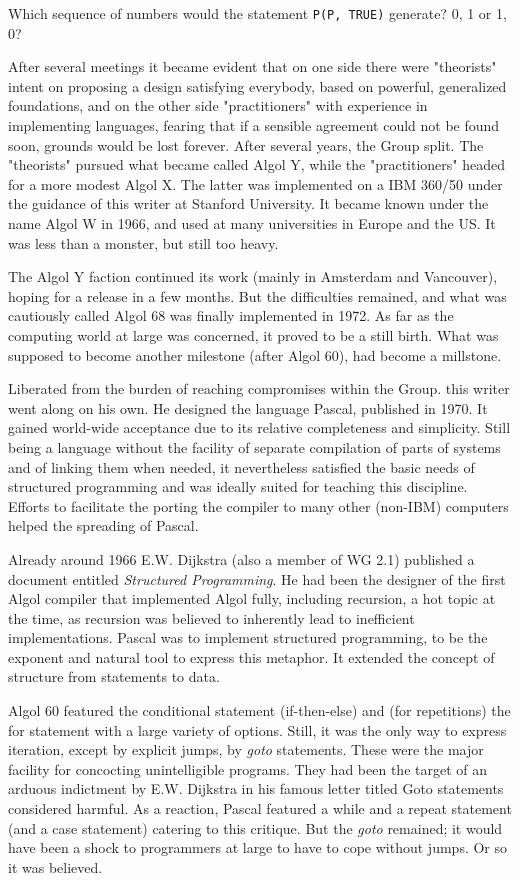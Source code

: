 Which sequence of numbers would the statement \verb|P(P, TRUE)| generate?
0, 1 or 1, 0?

After several meetings it became evident that on one side there were "theorists"
intent on proposing a design satisfying everybody, based on powerful, generalized
foundations, and on the other side "practitioners" with experience in implementing
languages, fearing that if a sensible agreement could not be found soon, grounds
would be lost forever. After several years, the Group split. The "theorists" pursued
what became called Algol Y, while the "practitioners" headed for a more modest
Algol X. The latter was implemented on a IBM 360/50 under the guidance of this
writer at Stanford University. It became known under the name Algol W in 1966,
and used at many universities in Europe and the US. It was less than a monster,
but still too heavy.

The Algol Y faction continued its work (mainly in Amsterdam and Vancouver),
hoping for a release in a few months. But the difficulties remained, and what was
cautiously called Algol 68 was finally implemented in 1972. As far as the computing
world at large was concerned, it proved to be a still birth. What was supposed to
become another milestone (after Algol 60), had become a millstone.

Liberated from the burden of reaching compromises within the Group. this writer
went along on his own. He designed the language Pascal, published in 1970. It
gained world-wide acceptance due to its relative completeness and simplicity. Still
being a language without the facility of separate compilation of parts of systems
and of linking them when needed, it nevertheless satisfied the basic needs of
structured programming and was ideally suited for teaching this discipline. Efforts
to facilitate the porting the compiler to many other (non-IBM) computers helped the
spreading of Pascal.

Already around 1966 E.W. Dijkstra (also a member of WG 2.1) published a
document entitled \emph{Structured Programming}. He had been the designer of the first
Algol compiler that implemented Algol fully, including recursion, a hot topic at the
time, as recursion was believed to inherently lead to inefficient implementations.
Pascal was to implement structured programming, to be the exponent and natural
tool to express this metaphor. It extended the concept of structure from statements
to data.

Algol 60 featured the conditional statement (if-then-else) and (for repetitions) the
for statement with a large variety of options. Still, it was the only way to express
iteration, except by explicit jumps, by \emph{goto} statements. These were the major
facility for concocting unintelligible programs. They had been the target of an
arduous indictment by E.W. Dijkstra in his famous letter titled Goto statements
considered harmful. As a reaction, Pascal featured a while and a repeat statement
(and a case statement) catering to this critique. But the \emph{goto} remained;
it would have been a shock to programmers at large to have to cope without jumps.
Or so it was believed.

